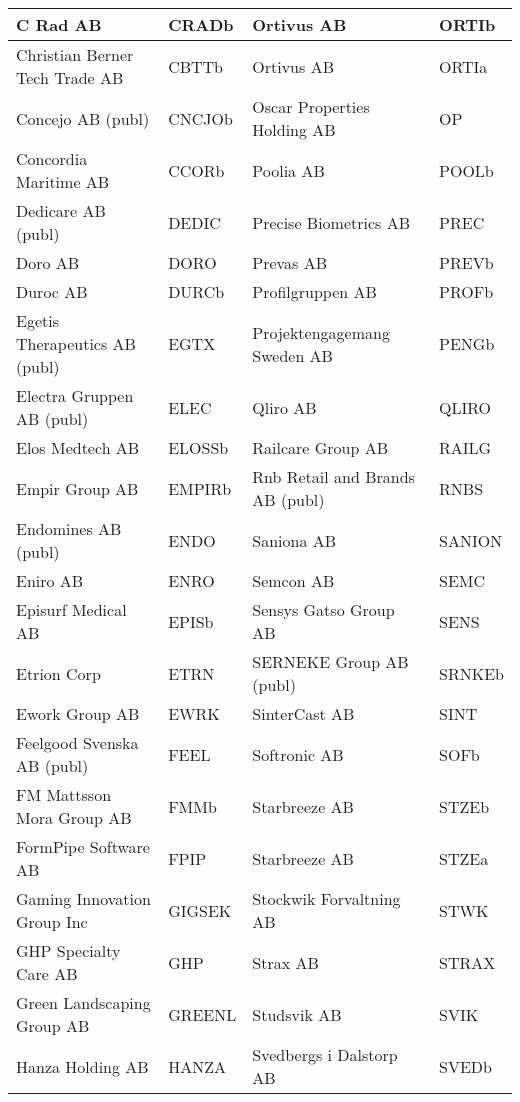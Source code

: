 \documentclass[11pt]{article}
\begin{document}
\begin{table}[H]
{\begin{tabular}{|l|l|l|l|}
C Rad AB & CRADb & Ortivus AB & ORTIb \\ \hline
\rowcolor[HTML]{EFEFEF} 
Christian Berner Tech Trade AB & CBTTb & Ortivus AB & ORTIa \\ \hline
Concejo AB (publ) & CNCJOb & Oscar Properties Holding AB & OP \\ \hline
\rowcolor[HTML]{EFEFEF} 
Concordia Maritime AB & CCORb & Poolia AB & POOLb \\ \hline
Dedicare AB (publ) & DEDIC & Precise Biometrics AB & PREC \\ \hline
\rowcolor[HTML]{EFEFEF} 
Doro AB & DORO & Prevas AB & PREVb \\ \hline
Duroc AB & DURCb & Profilgruppen AB & PROFb \\ \hline
\rowcolor[HTML]{EFEFEF} 
Egetis Therapeutics AB (publ) & EGTX & Projektengagemang Sweden AB & PENGb \\ \hline
Electra Gruppen AB (publ) & ELEC & Qliro AB & QLIRO \\ \hline
\rowcolor[HTML]{EFEFEF} 
Elos Medtech AB & ELOSSb & Railcare Group AB & RAILG \\ \hline
Empir Group AB & EMPIRb & Rnb Retail and Brands AB (publ) & RNBS \\ \hline
\rowcolor[HTML]{EFEFEF} 
Endomines AB (publ) & ENDO & Saniona AB & SANION \\ \hline
Eniro AB & ENRO & Semcon AB & SEMC \\ \hline
\rowcolor[HTML]{EFEFEF} 
Episurf Medical AB & EPISb & Sensys Gatso Group AB & SENS \\ \hline
Etrion Corp & ETRN & SERNEKE Group AB (publ) & SRNKEb \\ \hline
\rowcolor[HTML]{EFEFEF} 
Ework Group AB & EWRK & SinterCast AB & SINT \\ \hline
Feelgood Svenska AB (publ) & FEEL & Softronic AB & SOFb \\ \hline
\rowcolor[HTML]{EFEFEF} 
FM Mattsson Mora Group AB & FMMb & Starbreeze AB & STZEb \\ \hline
FormPipe Software AB & FPIP & Starbreeze AB & STZEa \\ \hline
\rowcolor[HTML]{EFEFEF} 
Gaming Innovation Group Inc & GIGSEK & Stockwik Forvaltning AB & STWK \\ \hline
GHP Specialty Care AB & GHP & Strax AB & STRAX \\ \hline
\rowcolor[HTML]{EFEFEF} 
Green Landscaping Group AB & GREENL & Studsvik AB & SVIK \\ \hline
Hanza Holding AB & HANZA & Svedbergs i Dalstorp AB & SVEDb \\ \hline

\end{tabular}}
\end{table}
\end{document}
